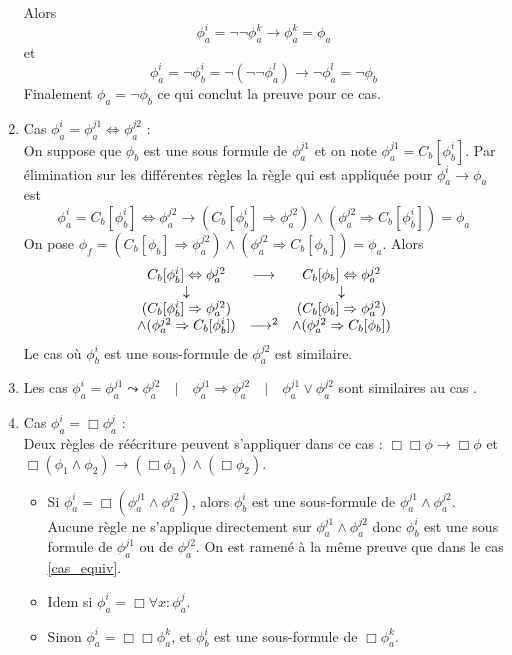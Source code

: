 \documentclass[12pt]{article}
\newcommand{\lra}{\ensuremath{\longrightarrow}}
\newcommand{\qbq}{\ensuremath{\quad | \quad}}
\begin{document}
\begin{enumerate}
  Alors
  \[\phi_a^i = \neg \neg \phi_a^k \lra \phi_a^k = \phi_a\]
  et
  \[\phi_a^i = \neg \phi_b^i = \neg (\neg \neg \phi_a^l) \lra \neg \phi_a^l = \neg \phi_b\]
  Finalement \(\phi_a = \neg \phi_b\) ce qui conclut la preuve pour ce cas.
\item \label{cas_equiv}
  Cas \(\phi_a^i = \phi_a^{j1} \Leftrightarrow \phi_a^{j2}\) : \\
  On suppose que \(\phi_b\) est une sous formule de \(\phi_a^{j1}\) et on note \(\phi_a^{j1} = C_b[\phi_b^i]\).
  Par élimination sur les différentes règles la règle qui est appliquée pour \(\phi_a^i \lra \phi_a\) est
  \[\phi_a^i = C_b[\phi_b^i] \Leftrightarrow \phi_a^{j2} \lra (C_b[\phi_b^i] \Rightarrow \phi_a^{j2}) \land (\phi_a^{j2} \Rightarrow C_b[\phi_b^i]) = \phi_a\]
  On pose \(\phi_f = (C_b[\phi_b] \Rightarrow \phi_a^{j2}) \land (\phi_a^{j2} \Rightarrow C_b[\phi_b]) = \phi_a\).
  Alors
  \[\begin{array}{c c c}
      C_b[\phi_b^i] \Leftrightarrow \phi_a^{j2} & \lra & C_b[\phi_b] \Leftrightarrow \phi_a^{j2} \\
      \downarrow & & \downarrow \\
      (C_b[\phi_b^i] \Rightarrow \phi_a^{j2}) & & (C_b[\phi_b] \Rightarrow \phi_a^{j2}) \\
      \land (\phi_a^{j2} \Rightarrow C_b[\phi_b^i]) & \lra^2 & \land (\phi_a^{j2} \Rightarrow C_b[\phi_b])
    \end{array} \]
  Le cas où \(\phi_b^i\) est une sous-formule de \(\phi_a^{j2}\) est similaire.
\item Les cas \(\phi_a^i =
  \phi_a^{j1} \leadsto \phi_a^{j2} \qbq
  \phi_a^{j1} \Rightarrow \phi_a^{j2} \qbq
  \phi_a^{j1} \lor \phi_a^{j2}\)
  sont similaires au cas \label{cas_equiv}.
\item \label{cas_toujours}
  Cas \(\phi_a^i = \Box \phi_a^j\) : \\
  Deux règles de réécriture peuvent s'appliquer dans ce cas : \(\Box \Box \phi \lra \Box \phi\) et \(\Box (\phi_1 \land \phi_2) \lra (\Box \phi_1) \land (\Box \phi_2)\).
  \begin{itemize}
  \item Si \(\phi_a^i = \Box (\phi_a^{j1} \land \phi_a^{j2})\), alors \(\phi_b^i\) est une sous-formule de \(\phi_a^{j1} \land \phi_a^{j2}\).
    Aucune règle ne s'applique directement sur \(\phi_a^{j1} \land \phi_a^{j2}\) donc \(\phi_b^i\) est une sous formule de \(\phi_a^{j1}\) ou de \(\phi_a^{j2}\).
    On est ramené à la même preuve que dans le cas \ref{cas_equiv}.
  \item Idem si \(\phi_a^i = \Box \forall x : \phi_a^j\).
  \item Sinon \(\phi_a^i = \Box \Box \phi_a^k\), et \(\phi_b^i\) est une sous-formule de \(\Box \phi_a^k\).


\end{itemize}
\end{enumerate}
\end{document}
